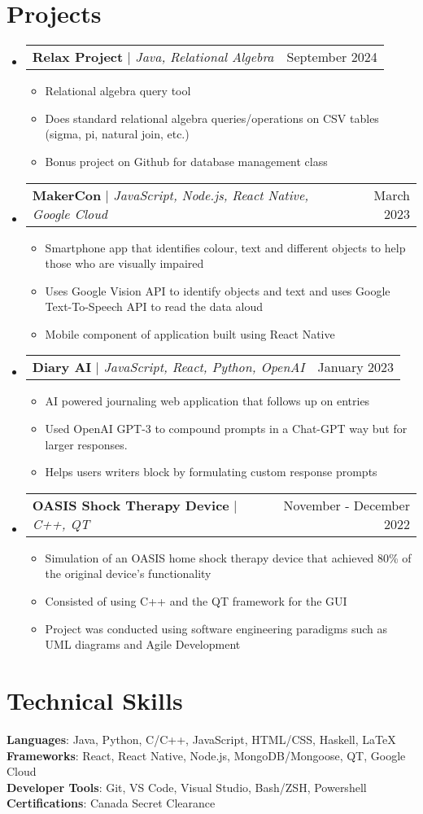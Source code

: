 \documentclass[letterpaper,11pt]{article}
\makeatletter
\newcommand{\resumeItem}[1]{
  \item\small{
    {#1 \vspace{-2pt}}
  }
}
\newcommand{\resumeProjectHeading}[2]{
    \item
    \begin{tabular*}{0.97\textwidth}{l@{\extracolsep{\fill}}r}
      \small#1 & #2 \\
    \end{tabular*}\vspace{-7pt}
}
\newcommand{\resumeSubHeadingListStart}{\begin{itemize}[leftmargin=0.15in, label={}]}
\newcommand{\resumeSubHeadingListEnd}{\end{itemize}}
\newcommand{\resumeItemListStart}{\begin{itemize}}
\newcommand{\resumeItemListEnd}{\end{itemize}\vspace{-5pt}}
\makeatother
\begin{document}
\section{Projects}
    \resumeSubHeadingListStart
    \resumeProjectHeading
          {\textbf{Relax Project} $|$ \emph{Java, Relational Algebra}}{September 2024}
          \resumeItemListStart
            \resumeItem{Relational algebra query tool}
            \resumeItem{Does standard relational algebra queries/operations on CSV tables (sigma, pi, natural join, etc.)}
            \resumeItem{Bonus project on Github for database management class}
          \resumeItemListEnd
    
    \resumeProjectHeading
          {\textbf{MakerCon} $|$ \emph{JavaScript, Node.js, React Native, Google Cloud}}{March 2023}
          \resumeItemListStart
            \resumeItem{Smartphone app that identifies colour, text and different objects to help those who are visually impaired}
            \resumeItem{Uses Google Vision API to identify objects and text and uses Google Text-To-Speech API to read the data aloud}
            \resumeItem{Mobile component of application built using React Native}
          \resumeItemListEnd
      
      \resumeProjectHeading
          {\textbf{Diary AI} $|$ \emph{JavaScript, React, Python, OpenAI}}{January 2023}
          \resumeItemListStart
            \resumeItem{AI powered journaling web application that follows up on entries}
            \resumeItem{Used OpenAI GPT-3 to compound prompts in a Chat-GPT way but for larger responses.}
            \resumeItem{Helps users writers block by formulating custom response prompts}
          \resumeItemListEnd
    \resumeProjectHeading
          {\textbf{OASIS Shock Therapy Device} $|$ \emph{C++, QT}}{November - December 2022}
          \resumeItemListStart
            \resumeItem{Simulation of an OASIS home shock therapy device that achieved 80\% of the original device's functionality}
            \resumeItem{Consisted of using C++ and the QT framework for the GUI}
            \resumeItem{Project was conducted using software engineering paradigms such as UML diagrams and Agile Development}
          \resumeItemListEnd
    \resumeSubHeadingListEnd



%
\section{Technical Skills}
 \begin{itemize}[leftmargin=0.15in, label={}]
    \small{\item{
     \textbf{Languages}{:  Java, Python, C/C++, JavaScript, HTML/CSS, Haskell, LaTeX} \\
     \textbf{Frameworks}{: React, React Native, Node.js, MongoDB/Mongoose, QT, Google Cloud} \\
     \textbf{Developer Tools}{: Git, VS Code, Visual Studio, Bash/ZSH, Powershell} \\
     \textbf{Certifications}{:  Canada Secret Clearance}
    }}
 \end{itemize}



\end{document}

